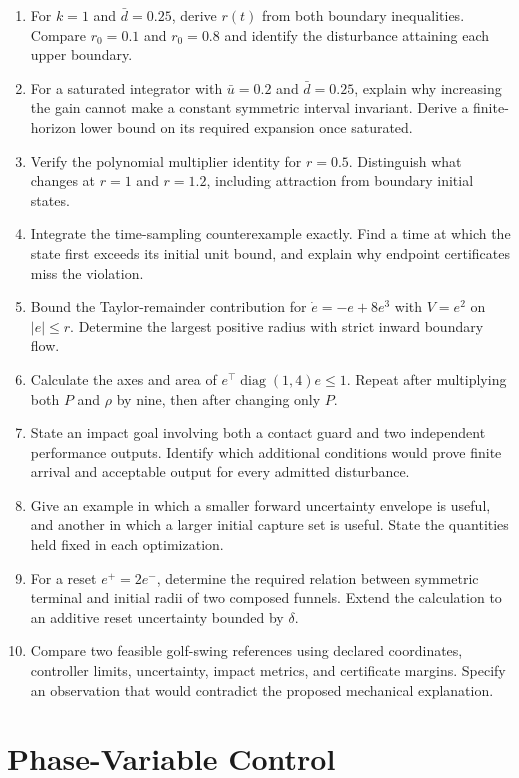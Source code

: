 \documentclass[12pt, openany]{book}
\theoremstyle{plain}
\begin{document}
\begin{enumerate}[itemsep=0.25em,parsep=0pt]
\item For $k=1$ and $\bar d=0.25$, derive $r(t)$ from both boundary inequalities. Compare $r_0=0.1$ and $r_0=0.8$ and identify the disturbance attaining each upper boundary.
\item For a saturated integrator with $\bar u=0.2$ and $\bar d=0.25$, explain why increasing the gain cannot make a constant symmetric interval invariant. Derive a finite-horizon lower bound on its required expansion once saturated.
\item Verify the polynomial multiplier identity for $r=0.5$. Distinguish what changes at $r=1$ and $r=1.2$, including attraction from boundary initial states.
\item Integrate the time-sampling counterexample exactly. Find a time at which the state first exceeds its initial unit bound, and explain why endpoint certificates miss the violation.
\item Bound the Taylor-remainder contribution for $\dot e=-e+8e^3$ with $V=e^2$ on $|e|\leq r$. Determine the largest positive radius with strict inward boundary flow.
\item Calculate the axes and area of $e^\top\operatorname{diag}(1,4)e\leq1$. Repeat after multiplying both $P$ and $\rho$ by nine, then after changing only $P$.
\item State an impact goal involving both a contact guard and two independent performance outputs. Identify which additional conditions would prove finite arrival and acceptable output for every admitted disturbance.
\item Give an example in which a smaller forward uncertainty envelope is useful, and another in which a larger initial capture set is useful. State the quantities held fixed in each optimization.
\item For a reset $e^+=2e^-$, determine the required relation between symmetric terminal and initial radii of two composed funnels. Extend the calculation to an additive reset uncertainty bounded by $\delta$.
\item Compare two feasible golf-swing references using declared coordinates, controller limits, uncertainty, impact metrics, and certificate margins. Specify an observation that would contradict the proposed mechanical explanation.
\end{enumerate}

\chapter{Phase-Variable Control}
\label{ch:phase_variable_control}
\end{document}

